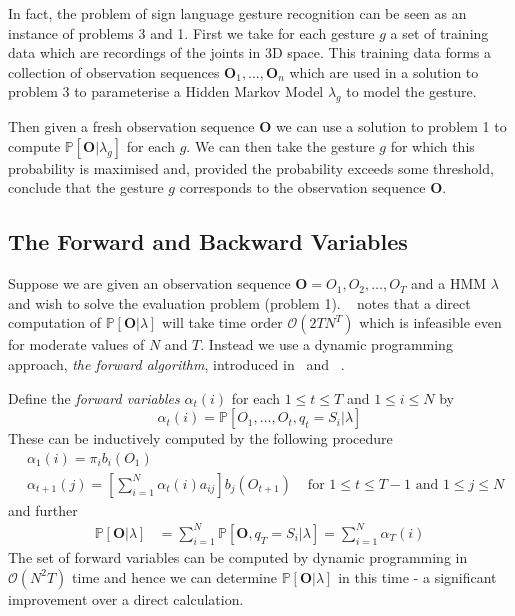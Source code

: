 In fact, the problem of sign language gesture recognition can be seen as an instance of problems 3 and 1. First we take for each gesture $g$ a set of training data which are recordings of the joints in 3D space. This training data forms a collection of observation sequences $\bm{O}_1, \dots, \bm{O}_n$ which are used in a solution to problem 3 to parameterise a Hidden Markov Model $\lambda_g$ to model the gesture.

Then given a fresh observation sequence $\bm{O}$ we can use a solution to problem 1 to compute $\mathbb{P}[\bm{O} | \lambda_g]$ for each $g$. We can then take the gesture $g$ for which this probability is maximised and, provided the probability exceeds some threshold, conclude that the gesture $g$ corresponds to the observation sequence $\bm{O}$. 

\subsection{The Forward and Backward Variables}
Suppose we are given an observation sequence $\bm{O} = O_1,O_2,\dots,O_T$ and a HMM $\lambda$ and wish to solve the evaluation problem (problem 1). ~\citet{rabiner1989tutorial} notes that a direct computation of $\mathbb{P}[\bm{O}|\lambda]$ will take time order $\mathcal{O}(2TN^T)$ which is infeasible even for moderate values of $N$ and $T$. Instead we use a dynamic programming approach, \emph{the forward algorithm}, introduced in~\citet{baum1968growth} and ~\cite{baum1970maximization}.

Define the \emph{forward variables} $\alpha_t(i)$ for each $1\leq t \leq T$ and $1 \leq i \leq N$ by
\begin{equation*}
\alpha_t(i) = \mathbb{P}[O_1, \dots, O_t, q_t=S_i | \lambda]
\end{equation*}
These can be inductively computed by the following procedure 
\begin{align*}
&\alpha_1(i) = \pi_ib_i(O_1)\\
&\alpha_{t+1}(j) = \left[ \sum_{i=1}^{N} \alpha_{t}(i)a_{ij} \right]b_j(O_{t+1}) &\text{ for $1\leq t \leq T-1$ and $1 \leq j \leq N$}
\end{align*}
and further
\begin{align*}
\mathbb{P}[\bm{O} | \lambda] &= \sum_{i=1}^N \mathbb{P}[\bm{O}, q_T = S_i | \lambda] = \sum_{i=1}^N \alpha_T(i)
\end{align*}
The set of forward variables can be computed by dynamic programming in $\mathcal{O}(N^2T)$ time and hence we can determine $\mathbb{P}[\bm{O} | \lambda]$ in this time -  a significant improvement over a direct calculation.

